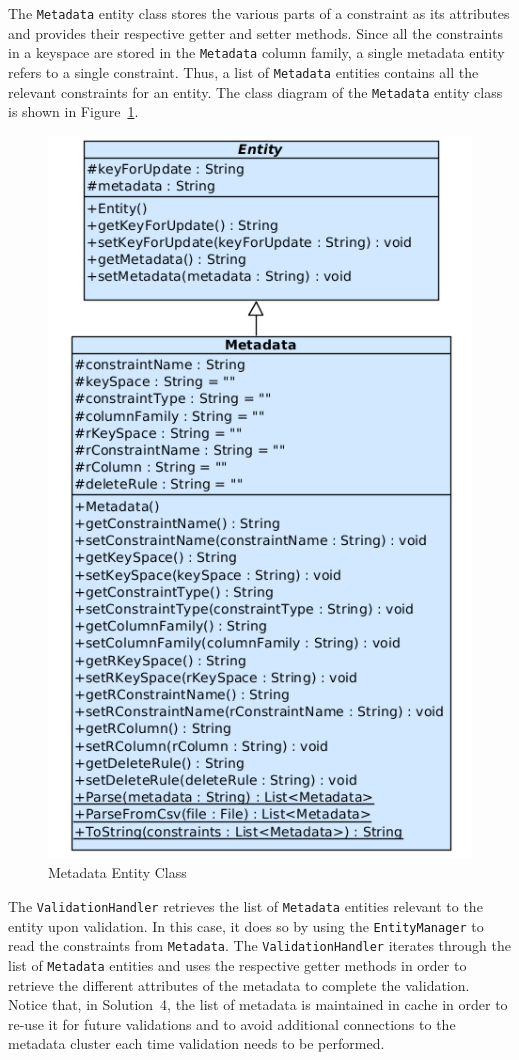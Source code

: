  
The \texttt{Metadata} entity class stores the various parts of a constraint as
its attributes and provides their respective getter and setter methods.  Since
all the constraints in a keyspace are stored in the \texttt{Metadata} column
family, a single metadata entity refers to a single constraint. Thus, a list
of \texttt{Metadata} entities contains  all the relevant constraints for an
entity. The class diagram of the \texttt{Metadata} entity class is shown in
Figure~\ref{fi:MetadataEntityClass}.

	\begin{figure}[h] 
		\centering		
		\includegraphics[width=.5\textwidth]{./figure/uml/metadata.png}
		\caption{Metadata Entity Class}\label{fi:MetadataEntityClass}
	\end{figure}
	
The \texttt{ValidationHandler} retrieves the list of \texttt{Metadata} entities
relevant to the entity upon validation.  In this case, it does so by using the
\texttt{EntityManager} to read the constraints from \texttt{Metadata}.  The
\texttt{Validation\-Handler} iterates through the list of 
\texttt{Metadata} entities and uses the respective getter methods in order to
retrieve the different attributes of the metadata to complete the validation. 
Notice that, in Solution~4, the list of metadata is maintained in
cache in order to re-use it for future validations and to avoid additional 
connections to the metadata cluster each time validation needs to be 
performed.


